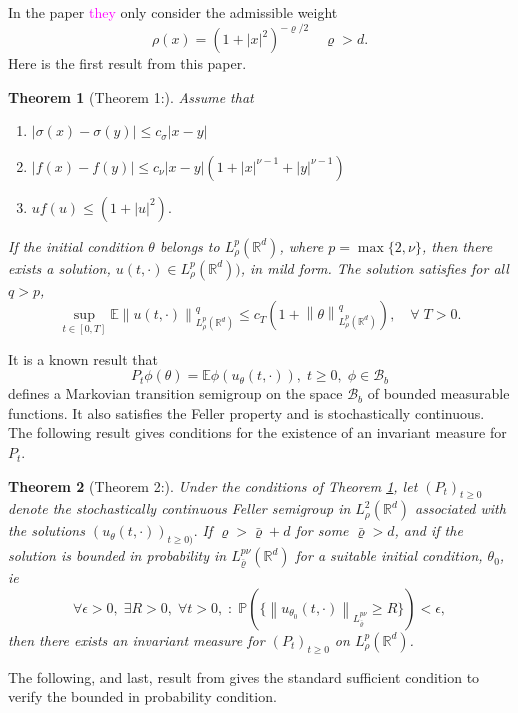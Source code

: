 \documentclass[a4paper,11pt]{article}%
\numberwithin{equation}{section}
\theoremstyle{plain}
\newtheorem{theorem}{Theorem}[section]
\theoremstyle{definition}
\newcommand{\R}{\mathbb{R}}
\newcommand{\Norm}[1]{\left\|  #1   \right\|}
\begin{document}
In the paper \textcolor{magenta}{they} only consider the admissible weight
	\[
		\rho(x) = (1+|x|^2)^{-\varrho/2} \quad \varrho > d.
	\]
Here is the first result from this paper.
	\begin{theorem}[Theorem 1:]\label{T:AMth1}
Assume that
		\begin{enumerate}
			\item $|\sigma(x) - \sigma(y)| \le c_\sigma |x-y|$
			\item $ |f(x)-f(y)| \le c_{\nu}|x-y|(1+|x|^{\nu -1} + |y|^{\nu -1}) $
			\item $uf(u) \le (1+|u|^2).$
		\end{enumerate}
If the initial condition $\theta$ belongs to $L_\rho^p(\R^d)$, where $p=\max\{2, \nu\}$, then there exists a solution, $u(t,\cdot) \in L_\rho^p(\R^d))$, in mild form. The solution satisfies for all $q > p$,
	\[
		\sup_{t \in [0,T]} \mathbb{E}\Norm{u(t,\cdot)}^q_{L_\rho^p(\R^d)} \le c_T(1+ \Norm{\theta}^q_{L_\rho^p(\R^d)}),  \quad \forall \; T>0.
	\]
	\end{theorem}

It is a known result that
	\[
		P_t\phi(\theta) = \mathbb{E}\phi(u_\theta(t,\cdot)), \; t\ge 0, \; \phi \in \mathscr{B}_b
	\]
defines a Markovian transition semigroup on the space $\mathscr{B}_b$ of bounded measurable functions. It also satisfies the Feller property and is stochastically continuous. The following result gives conditions for the existence of an invariant measure for $P_t$.

	\begin{theorem}[Theorem 2:]
		Under the conditions of Theorem \ref{T:AMth1}, let $(P_t)_{t\ge0}$ denote the stochastically continuous Feller semigroup in $L^2_\rho(\R^d)$ associated with the solutions $(u_\theta(t,\cdot))_{ t \ge 0)}.$ If $\varrho > \bar{\varrho} + d$ for some $\bar{\varrho} > d$, and if the solution is bounded in probability in $L^{p\nu}_{\bar{\varrho}}(\R^d)$ for a suitable initial condition, $\theta_0$, ie
			\[
				\forall \epsilon >0, \; \exists R>0, \; \forall t>0,\; : \; \mathbb{P}( \{ \Norm{u_{\theta_0}(t,\cdot)}_{L^{p\nu}_{\bar{\varrho} }} \ge R \}) < \epsilon,
			\]
		then there exists an invariant measure for $(P_t)_{t\ge 0}$ on $L^p_{\rho}(\R^d)$.
	\end{theorem}

The following, and last, result from \cite{AM03} gives the standard sufficient condition to verify the bounded in probability condition.
\end{document}
